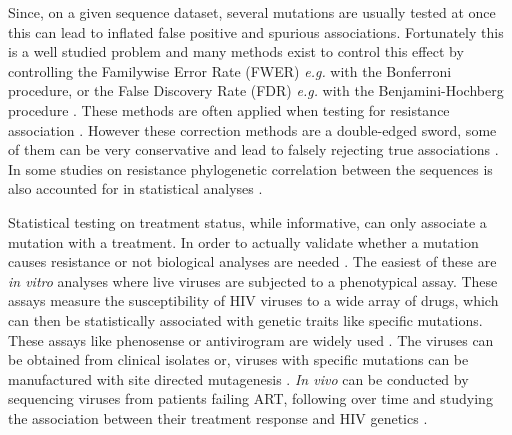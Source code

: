 \documentclass[
  11pt,
  twoside,
  BCOR=10mm,
  listof=totoc]{scrbook}
\begin{document}
Since, on a given sequence dataset, several mutations are usually tested at once this can lead to inflated false positive \autocite{brownMethodsCorrectingMultiple1997} and spurious \autocite{austinTestingMultipleStatistical2006} associations. Fortunately this is a well studied problem and many methods exist to control this effect by controlling the Familywise Error Rate (FWER) \emph{e.g.} with the Bonferroni procedure,\autocite{hochbergMultipleComparisonProcedures1987} or the False Discovery Rate (FDR) \emph{e.g.} with the Benjamini-Hochberg procedure \autocite{benjaminiControllingFalseDiscovery1995}. These methods are often applied when testing for resistance association \autocite{villabona-arenasIndepthAnalysisHIV12016,gonzalesExtendedSpectrumHIV12003,seoigheModelDirectionalSelection2007}. However these correction methods are a double-edged sword, some of them can be very conservative and lead to falsely rejecting true associations \autocite{shamStatisticalPowerSignificance2014}. In some studies on resistance phylogenetic correlation between the sequences is also accounted for in statistical analyses \autocite{alizonPhylogeneticApproachReveals2010,flynnDeepSequencingProtease2015}.

Statistical testing on treatment status, while informative, can only associate a mutation with a treatment. In order to actually validate whether a mutation causes resistance or not biological analyses are needed \autocite{johnsonUpdateDrugResistance2016,wensing2019UpdateDrug2019}. The easiest of these are \emph{in vitro} analyses where live viruses are subjected to a phenotypical assay. These assays measure the susceptibility of HIV viruses to a wide array of drugs, which can then be statistically associated with genetic traits like specific mutations. These assays like phenosense \autocite{petropoulosNovelPhenotypicDrug2000} or antivirogram \autocite{hertogsRapidMethodSimultaneous1998} are widely used \autocite{heilek-snyderRoleHIVPhenotypic2002,moyleEpidemiologyPredictiveFactors2005,gartlandSusceptibilityGlobalHIV12021}. The viruses can be obtained from clinical isolates \autocite{masquelierGenotypicPhenotypicResistance2001} or, viruses with specific mutations can be manufactured with site directed mutagenesis \autocite{larderMultipleMutationsHIV11989,devreeseResistanceHumanImmunodeficiency1992}. \emph{In vivo} can be conducted by sequencing viruses from patients failing ART, following over time and studying the association between their treatment response and HIV genetics \autocite{tambuyzerEffectMutationsPosition2011,katzensteinPhenotypicSusceptibilityVirological2003}.
\end{document}
